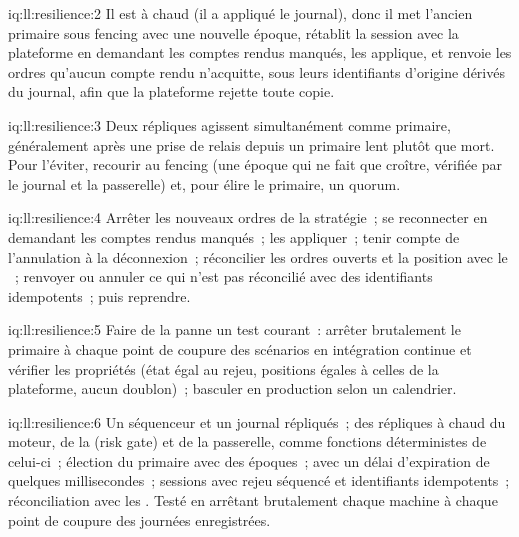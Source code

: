 \begin{solution}{iq:ll:resilience:2}
Il est à chaud (il a appliqué le journal), donc il met l'ancien primaire sous fencing avec une nouvelle époque, rétablit la session avec la plateforme en demandant les
comptes rendus manqués, les applique, et renvoie les ordres qu'aucun compte rendu n'acquitte, sous leurs identifiants d'origine dérivés du journal,
afin que la plateforme rejette toute copie.
\end{solution}

\begin{solution}{iq:ll:resilience:3}
Deux répliques agissent simultanément comme primaire, généralement après une prise de relais depuis un primaire lent plutôt que mort. Pour l'éviter, recourir
au fencing (une époque qui ne fait que croître, vérifiée par le journal et la passerelle) et, pour élire le primaire, un quorum.
\end{solution}

\begin{solution}{iq:ll:resilience:4}
Arrêter les nouveaux ordres de la stratégie~; se reconnecter en demandant les comptes rendus manqués~; les appliquer~; tenir compte de l'annulation à la déconnexion~; réconcilier
les ordres ouverts et la position avec le ~; renvoyer ou annuler ce qui n'est pas réconcilié avec des identifiants idempotents~; puis
reprendre.
\end{solution}

\begin{solution}{iq:ll:resilience:5}
Faire de la panne un test courant~: arrêter brutalement le primaire à chaque point de coupure des scénarios en intégration continue et vérifier les propriétés
(état égal au rejeu, positions égales à celles de la plateforme, aucun doublon)~; basculer en production selon un calendrier.
\end{solution}

\begin{solution}{iq:ll:resilience:6}
Un séquenceur et un journal répliqués~; des répliques à chaud du moteur, de la  (risk gate) et de la passerelle, comme fonctions déterministes de celui-ci~;
élection du primaire avec des époques~;  avec un délai d'expiration de quelques millisecondes~; sessions avec rejeu séquencé et
identifiants idempotents~; réconciliation avec les . Testé en arrêtant brutalement chaque machine à chaque point de coupure des journées enregistrées.
\end{solution}
